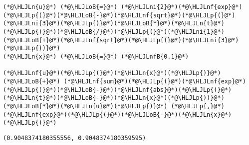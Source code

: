 \documentclass[12pt,landscape]{article}
\newcommand{\HLJLn}[1]{#1}
\newcommand{\HLJLnf}[1]{\textcolor[RGB]{66,102,213}{#1}}
\newcommand{\HLJLnfB}[1]{\textcolor[RGB]{59,151,46}{#1}}
\newcommand{\HLJLni}[1]{\textcolor[RGB]{59,151,46}{#1}}
\newcommand{\HLJLoB}[1]{\textcolor[RGB]{102,102,102}{\textbf{#1}}}
\newcommand{\HLJLp}[1]{#1}
\begin{document}
{\begin{lstlisting}
(*@\HLJLn{u}@*) (*@\HLJLoB{=}@*) (*@\HLJLni{2}@*)(*@\HLJLnf{exp}@*)(*@\HLJLp{(}@*)(*@\HLJLoB{-}@*)(*@\HLJLnf{sqrt}@*)(*@\HLJLp{(}@*)(*@\HLJLni{3}@*)(*@\HLJLp{)}@*)(*@\HLJLoB{*}@*)(*@\HLJLn{t}@*)(*@\HLJLp{)}@*)(*@\HLJLoB{/}@*)(*@\HLJLp{(}@*)(*@\HLJLni{1}@*)(*@\HLJLoB{+}@*)(*@\HLJLnf{sqrt}@*)(*@\HLJLp{(}@*)(*@\HLJLni{3}@*)(*@\HLJLp{))}@*)
(*@\HLJLn{x}@*) (*@\HLJLoB{=}@*) (*@\HLJLnfB{0.1}@*)

(*@\HLJLnf{u}@*)(*@\HLJLp{(}@*)(*@\HLJLn{x}@*)(*@\HLJLp{)}@*) (*@\HLJLoB{+}@*) (*@\HLJLnf{sum}@*)(*@\HLJLp{(}@*)(*@\HLJLnf{exp}@*)(*@\HLJLp{(}@*)(*@\HLJLoB{-}@*)(*@\HLJLnf{abs}@*)(*@\HLJLp{(}@*)(*@\HLJLn{t}@*)(*@\HLJLoB{-}@*)(*@\HLJLn{x}@*)(*@\HLJLp{))}@*)(*@\HLJLoB{*}@*)(*@\HLJLn{u}@*)(*@\HLJLp{)}@*) (*@\HLJLp{,}@*) (*@\HLJLnf{exp}@*)(*@\HLJLp{(}@*)(*@\HLJLoB{-}@*)(*@\HLJLn{x}@*)(*@\HLJLp{)}@*)
\end{lstlisting}

\begin{lstlisting}
(0.9048374180355556, 0.9048374180359595)
\end{lstlisting}


}
\end{document}
